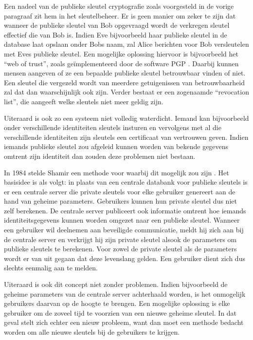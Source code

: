 Een nadeel van de publieke sleutel cryptografie zoals voorgesteld in de vorige paragraaf zit hem in het sleutelbeheer. Er is geen manier om zeker te zijn dat wanneer de publieke sleutel van Bob opgevraagd wordt de verkregen sleutel effectief die van Bob is. Indien Eve bijvoorbeeld haar publieke sleutel in de database laat opslaan onder Bobs naam, zal Alice berichten voor Bob versleutelen met Eves publieke sleutel. Een mogelijke oplossing hiervoor is bijvoorbeeld het ``web of trust'', zoals ge\"implementeerd door de software PGP \cite{pgp}. Daarbij kunnen mensen aangeven of ze een bepaalde publieke sleutel betrouwbaar vinden of niet. Een sleutel die vergezeld wordt van meerdere getuigenissen van betrouwbaarheid zal dat dan waarschijnlijk ook zijn. Verder bestaat er een zogenaamde ``revocation list'', die aangeeft welke sleutels niet meer geldig zijn.

Uiteraard is ook zo een systeem niet volledig waterdicht. Iemand kan bijvoorbeeld onder verschillende identiteiten sleutels insturen en vervolgens met al die verschillende identiteiten zijn sleutels een certificaat van vertrouwen geven. Indien iemands publieke sleutel zou afgeleid kunnen worden van bekende gegevens omtrent zijn identiteit dan zouden deze problemen niet bestaan.

In 1984 stelde Shamir een methode voor waarbij dit mogelijk zou zijn \cite{shamir}. Het basisidee is als volgt: in plaats van een centrale databank voor publieke sleutels is er een centrale server die private sleutels voor elke gebruiker genereert aan de hand van geheime parameters. Gebruikers kunnen hun private sleutel dus niet zelf berekenen. De centrale server publiceert ook informatie omtrent hoe iemands identiteitsgegevens kunnen worden omgezet naar een publieke sleutel. Wanneer een gebruiker wil deelnemen aan beveiligde communicatie, meldt hij zich aan bij de centrale server en verkrijgt hij zijn private sleutel alsook de parameters om publieke sleutels te berekenen. Voor zowel de private sleutel als de parameters wordt er van uit gegaan dat deze levenslang gelden. Een gebruiker dient zich dus slechts eenmalig aan te melden.

Uiteraard is ook dit concept niet zonder problemen. Indien bijvoorbeeld de geheime parameters van de centrale server achterhaald worden, is het onmogelijk gebruikers daarvan op de hoogte te brengen. Een mogelijke oplossing is elke gebruiker om de zoveel tijd te voorzien van een nieuwe geheime sleutel. In dat geval stelt zich echter een nieuw probleem, want dan moet een methode bedacht worden om alle nieuwe sleutels bij de gebruikers te krijgen. 

